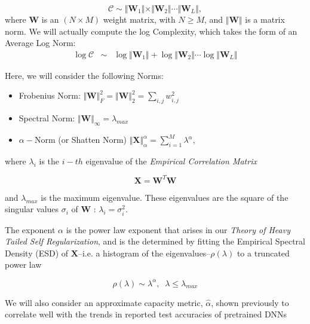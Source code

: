 \begin{equation}
\mathcal{C}\sim\Vert\mathbf{W}_{1}\Vert\times\Vert\mathbf{W}_{2}\Vert\cdots\Vert\mathbf{W}_{L}\Vert ,
\end{equation}
where $\mathbf{W}$ is an $(N\times M)$ weight matrix, with $N\ge M$, and 
 $\Vert\mathbf{W}\Vert$ is a matrix norm.   We will actually compute the log Complexity, which takes the form 
of an Average Log Norm:
\begin{eqnarray*}
\log\mathcal{C} &\sim& \log\Vert\mathbf{W}_{1}\Vert+\log\Vert\mathbf{W}_{2}\Vert\cdots\log\Vert\mathbf{W}_{L}\Vert
\end{eqnarray*}

Here, we will consider the following Norms:

\begin{itemize}
 \item Frobenius Norm: $\Vert\mathbf{W}\Vert^{2}_{F}=\Vert\mathbf{W}\Vert^{2}_{2}=\sum_{i,j}w^{2}_{i,j}$
 \item Spectral Norm:  $\Vert\mathbf{W}\Vert_{\infty}=\lambda_{max}$
 \item $\alpha-$Norm (or Shatten Norm) $\Vert\mathbf{X}\Vert^{\alpha}_{\alpha}=\sum_{i=1}^{M}\lambda^{\alpha}$,
\end{itemize}

where $\lambda_{i}$ is the $i-th$ eigenvalue of the \emph{Empirical Correlation Matrix}

\begin{equation}
\mathbf{X}=\mathbf{W}^{T}\mathbf{W}
\end{equation}

and $\lambda_{max}$ is the maximum eigenvalue. These eigenvalues are the square of the singular values $\sigma_{i}$ of $\mathbf{W}$ :  $\lambda_{i}=\sigma^{2}_{i}$.

The exponent $\alpha$ is the power law exponent that arises in our \emph{Theory of Heavy Tailed Self Regularization}, and is the determined by fitting the Empirical Spectral Density (ESD) of $\mathbf{X}$--i.e. a histogram of the eigenvalues--$\rho(\lambda)$ to a truncated power law

\begin{equation}
\rho(\lambda)\sim\lambda^{\alpha},\;\;\lambda\le\lambda_{max}
\end{equation}

We will also consider an approximate capacity metric, $\hat{\alpha}$, shown previously to correlate well with the trends in reported test accuracies of pretrained DNNs \cite{MM}

